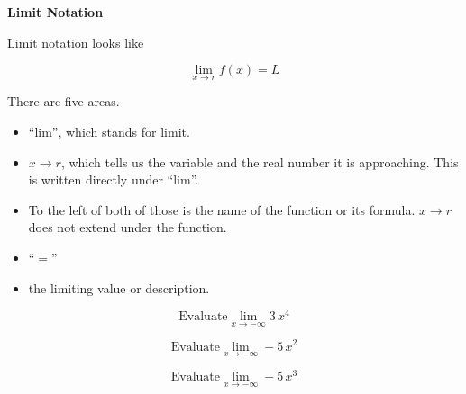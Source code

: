 \documentclass{ximera}
\begin{document}
\begin{notation} \textbf{\textcolor{blue!55!black}{Limit Notation}}


Limit notation looks like

\[
\lim\limits_{x \to r} f(x) = L
\]

There are five areas.


\begin{itemize}
  \item ``lim'', which stands for limit. \\
  \item $x \to r$, which tells us the variable and the real number it is approaching.  This is written directly under ``lim''.
  \item To the left of both of those is the name of the function or its formula.  $x \to r$ does not extend under the function.  
  \item ``$=$''
  \item the limiting value or description.
\end{itemize}



\end{notation}





\begin{question}

\[ \text{Evaluate} \lim_{x \to -\infty} 3 \, x^4 \]

\begin{multipleChoice}
\choice {$-\infty$}
\choice [correct]{$\infty$}
\end{multipleChoice}
\end{question}






\begin{question}

\[ \text{Evaluate} \lim_{x \to -\infty} -5 \, x^2 \]

\begin{multipleChoice}
\choice [correct]{$-\infty$}
\choice {$\infty$}
\end{multipleChoice}
\end{question}





\begin{question}

\[ \text{Evaluate} \lim_{x \to -\infty} -5 \, x^3 \]

\begin{multipleChoice}
\choice {$-\infty$}
\choice [correct]{$\infty$}
\end{multipleChoice}
\end{question}
\end{document}
